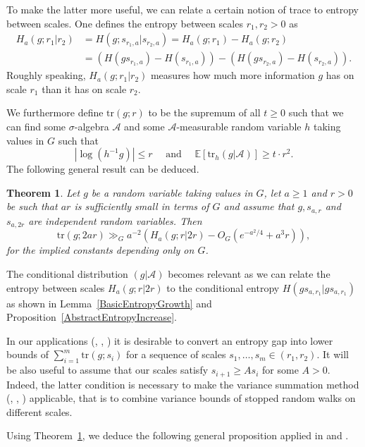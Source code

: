 \documentclass[10pt, english,oneside,reqno]{amsart}
\theoremstyle{plain}
\newtheorem{theorem}{Theorem}[section]
\theoremstyle{remark}
\numberwithin{equation}{section}
\numberwithin{figure}{section}
\newcommand{\tr}{\mathrm{tr}}
\newcommand{\E}{\mathbb{E}}
\begin{document}
To make the latter more useful, we can relate a certain notion of trace to entropy between scales. One defines the entropy between scales $r_1, r_2 > 0$ as 
\begin{align*}\label{DefEntScales}
    H_a(g;r_1|r_2) &= H(g; s_{r_1,a}| s_{r_2,a}) = H_a(g;r_1) - H_a(g;r_2) \\ &= (H(gs_{r_1,a}) - H(s_{r_1,a})) - ( H(gs_{r_2,a}) - H(s_{r_2,a})).
\end{align*} Roughly speaking, $H_a(g; r_1|r_2)$ measures how much more information $g$ has on scale $r_1$ than it has on scale $r_2$.

We furthermore define $\tr(g; r)$  to be the supremum of all $t\geq 0$ such that we can find some $\sigma$-algebra $\mathscr{A}$ and some $\mathscr{A}$-measurable random variable $h$ taking values in $G$ such that $$|\log(h^{-1}g)| \leq r \quad \text{ and } \quad \E[\tr_h(g|\mathscr{A})] \geq t\cdot r^2.$$ The following general result can be deduced. 

\begin{theorem}\label{MainEntropyIncrease}
    Let $g$ be a random variable taking values in $G$, let $a \geq 1$ and $r > 0$ be such that $ar$ is sufficiently small in terms of $G$ and assume that $g, s_{a,r}$ and $s_{a,2r}$ are independent random variables. Then $$\tr(g; 2ar) \gg_G a^{-2}(H_a(g; r|2r) - O_{G}(e^{-a^2/4} + a^3r)),$$ for the implied constants depending only on $G$.
\end{theorem}

The conditional distribution $(g|\mathscr{A})$ becomes relevant as we can relate the entropy between scales $H_a(g; r|2r)$ to the conditional entropy $H(g s_{a,r_1}| g s_{a,r_1})$ as shown in Lemma~\ref{BasicEntropyGrowth} and Proposition~\ref{AbstractEntropyIncrease}.

In our applications (\cite{Kittle2023}, \cite{KittleKogler2024ACSS}, \cite{KittleKogler2024Dimension}) it is desirable to convert an entropy gap into lower bounds of $\sum_{i=1}^m \tr (g ; s_i)$ for a sequence of scales $s_1, \dots, s_{m} \in (r_1, r_2)$. It will be also useful to assume that our scales satisfy $s_{i + 1} \geq A s_i$ for some $A > 0$. Indeed, the latter condition is necessary to make the variance summation method (\cite{Kittle2023}, \cite{KittleKogler2024ACSS}, \cite{KittleKogler2024Dimension}) applicable, that is to combine variance bounds of stopped random walks on different scales.

Using Theorem~\ref{MainEntropyIncrease}, we deduce the following general proposition applied in \cite{KittleKogler2024ACSS} and \cite{KittleKogler2024Dimension}. 
\end{document}
